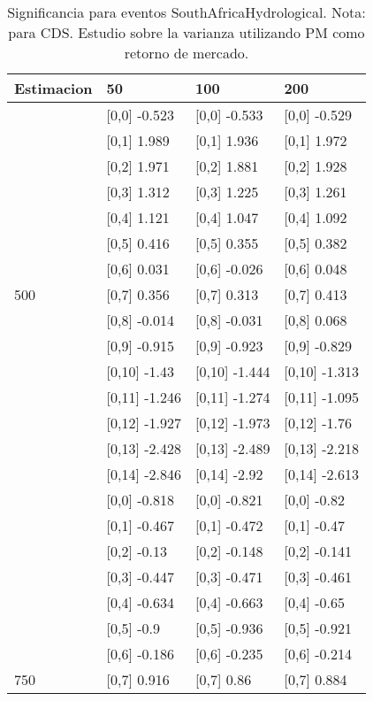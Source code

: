 \begin{table}

\caption{Significancia para eventos SouthAfricaHydrological. Nota: para CDS. Estudio sobre la varianza utilizando PM como retorno de mercado.}
\centering
\begin{tabular}[t]{llll}
\toprule
Estimacion & 50 & 100 & 200\\
\midrule
 & {}[0,0] -0.523 & {}[0,0] -0.533 & {}[0,0] -0.529\\
 & {}[0,1] 1.989 & {}[0,1] 1.936 & {}[0,1] 1.972\\
 & {}[0,2] 1.971 & {}[0,2] 1.881 & {}[0,2] 1.928\\
 & {}[0,3] 1.312 & {}[0,3] 1.225 & {}[0,3] 1.261\\
 & {}[0,4] 1.121 & {}[0,4] 1.047 & {}[0,4] 1.092\\
\addlinespace
 & {}[0,5] 0.416 & {}[0,5] 0.355 & {}[0,5] 0.382\\
 & {}[0,6] 0.031 & {}[0,6] -0.026 & {}[0,6] 0.048\\
500 & {}[0,7] 0.356 & {}[0,7] 0.313 & {}[0,7] 0.413\\
 & {}[0,8] -0.014 & {}[0,8] -0.031 & {}[0,8] 0.068\\
 & {}[0,9] -0.915 & {}[0,9] -0.923 & {}[0,9] -0.829\\
\addlinespace
 & {}[0,10] -1.43 & {}[0,10] -1.444 & {}[0,10] -1.313\\
 & {}[0,11] -1.246 & {}[0,11] -1.274 & {}[0,11] -1.095\\
 & {}[0,12] -1.927 & {}[0,12] -1.973 & {}[0,12] -1.76\\
 & {}[0,13] -2.428 & {}[0,13] -2.489 & {}[0,13] -2.218\\
 & {}[0,14] -2.846 & {}[0,14] -2.92 & {}[0,14] -2.613\\
\addlinespace
 & {}[0,0] -0.818 & {}[0,0] -0.821 & {}[0,0] -0.82\\
 & {}[0,1] -0.467 & {}[0,1] -0.472 & {}[0,1] -0.47\\
 & {}[0,2] -0.13 & {}[0,2] -0.148 & {}[0,2] -0.141\\
 & {}[0,3] -0.447 & {}[0,3] -0.471 & {}[0,3] -0.461\\
 & {}[0,4] -0.634 & {}[0,4] -0.663 & {}[0,4] -0.65\\
\addlinespace
 & {}[0,5] -0.9 & {}[0,5] -0.936 & {}[0,5] -0.921\\
 & {}[0,6] -0.186 & {}[0,6] -0.235 & {}[0,6] -0.214\\
750 & {}[0,7] 0.916 & {}[0,7] 0.86 & {}[0,7] 0.884\\

\end{tabular}
\end{table}
